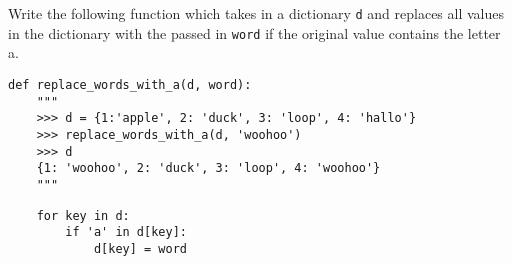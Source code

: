 \begin{blocksection}
\question Write the following function which takes in a dictionary \lstinline$d$ and replaces all values in the dictionary with the passed in \lstinline$word$ if the original value contains the letter a.

\begin{lstlisting}
def replace_words_with_a(d, word):
    """
    >>> d = {1:'apple', 2: 'duck', 3: 'loop', 4: 'hallo'}
    >>> replace_words_with_a(d, 'woohoo')
    >>> d
    {1: 'woohoo', 2: 'duck', 3: 'loop', 4: 'woohoo'}
    """
\end{lstlisting}

\begin{solution}[2in]
\begin{lstlisting}
    for key in d:
        if 'a' in d[key]:
            d[key] = word
\end{lstlisting}

\end{solution}
\end{blocksection}

